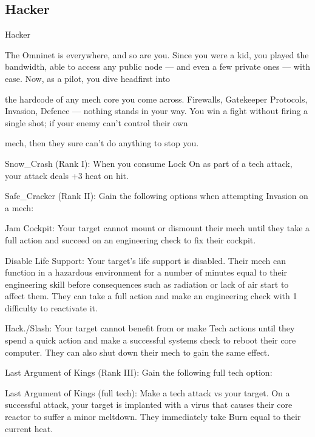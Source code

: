 \subsection{Hacker}

                                                     Hacker

The Omninet is everywhere, and so are you. Since you were a kid, you played the bandwidth, able to
access any public node — and even a few private ones — with ease. Now, as a pilot, you dive headfirst into

the hardcode of any mech core you come across. Firewalls, Gatekeeper Protocols, Invasion, Defence —
nothing stands in your way. You win a fight without firing a single shot; if your enemy can’t control their own

mech, then they sure can’t do anything to stop you.

Snow\_Crash (Rank I): When you consume Lock On as part of a tech attack, your attack deals
+3 heat on hit.

Safe\_Cracker (Rank II): Gain the following options when attempting Invasion on a mech:

         Jam Cockpit: Your target cannot mount or dismount their mech until they take a full
         action and succeed on an engineering check to fix their cockpit.

         Disable Life Support: Your target’s life support is disabled. Their mech can function in a
         hazardous environment for a number of minutes equal to their engineering skill before
         consequences such as radiation or lack of air start to affect them. They can take a full
         action and make an engineering check with 1 difficulty to reactivate it.

         Hack./Slash: Your target cannot benefit from or make Tech actions until they spend a
         quick action and make a successful systems check to reboot their core computer. They
         can also shut down their mech to gain the same effect.

Last Argument of Kings (Rank III): Gain the following full tech option:

	        Last Argument of Kings (full tech): Make a tech attack vs your target. On a successful
attack, your target is implanted with a virus that causes their core reactor to suffer a minor
meltdown. They immediately take Burn equal to their current heat.
